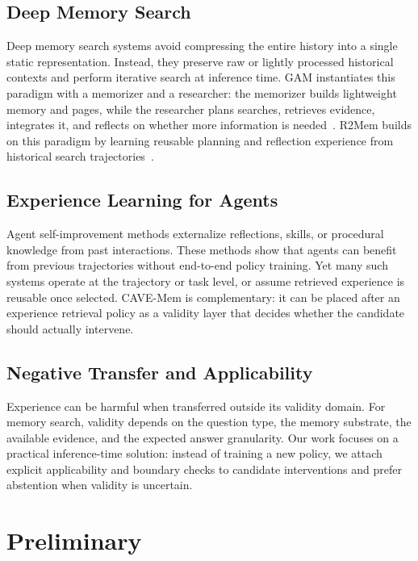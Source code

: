 \documentclass[conference]{IEEEtran}
\newcommand{\method}{CAVE-Mem}
\begin{document}
\subsection{Deep Memory Search}
Deep memory search systems avoid compressing the entire history into a single
static representation. Instead, they preserve raw or lightly processed
historical contexts and perform iterative search at inference time. GAM
instantiates this paradigm with a memorizer and a researcher: the memorizer
builds lightweight memory and pages, while the researcher plans searches,
retrieves evidence, integrates it, and reflects on whether more information is
needed~\cite{gam}. R2Mem builds on this paradigm by learning reusable planning
and reflection experience from historical search trajectories~\cite{r2mem}.

\subsection{Experience Learning for Agents}
Agent self-improvement methods externalize reflections, skills, or procedural
knowledge from past interactions. These methods show that agents can benefit
from previous trajectories without end-to-end policy training. Yet many such
systems operate at the trajectory or task level, or assume retrieved experience
is reusable once selected. \method{} is complementary: it can be placed after an
experience retrieval policy as a validity layer that decides whether the
candidate should actually intervene.

\subsection{Negative Transfer and Applicability}
Experience can be harmful when transferred outside its validity domain. For
memory search, validity depends on the question type, the memory substrate, the
available evidence, and the expected answer granularity. Our work focuses on a
practical inference-time solution: instead of training a new policy, we attach
explicit applicability and boundary checks to candidate interventions and
prefer abstention when validity is uncertain.

\section{Preliminary}
\end{document}
